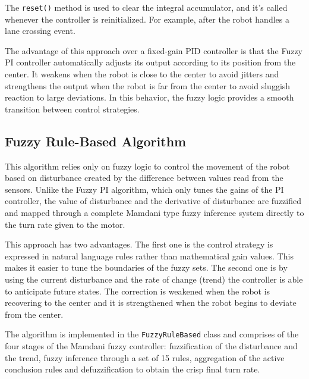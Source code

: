 The \texttt{reset()} method is used to clear the integral accumulator, and it’s called whenever the controller is reinitialized. For example, after the robot handles a lane crossing event.

The advantage of this approach over a fixed-gain PID controller is that the Fuzzy PI controller automatically adjusts its output according to its position from the center. It weakens when the robot is close to the center to avoid jitters and strengthens the output when the robot is far from the center to avoid sluggish reaction to large deviations. In this behavior, the fuzzy logic provides a smooth transition between control strategies.

\subsection{Fuzzy Rule-Based Algorithm}
\label{sec:fuzzy-rb}

This algorithm relies only on fuzzy logic to control the movement of the robot based on disturbance created by the difference between values read from the sensors. Unlike the Fuzzy PI algorithm, which only tunes the gains of the PI controller, the value of disturbance and the derivative of disturbance are fuzzified and mapped through a complete Mamdani type fuzzy inference system directly to the turn rate given to the motor.

This approach has two advantages. The first one is the control strategy is expressed in natural language rules rather than mathematical gain values. This makes it easier to tune the boundaries of the fuzzy sets. The second one is by using the current disturbance and the rate of change (trend) the controller is able to anticipate future states. The correction is weakened when the robot is recovering to the center and it is strengthened when the robot begins to deviate from the center.

The algorithm is implemented in the \texttt{FuzzyRuleBased} class and comprises of the four stages of the Mamdani fuzzy controller: fuzzification of the disturbance and the trend, fuzzy inference through a set of 15 rules, aggregation of the active conclusion rules and defuzzification to obtain the crisp final turn rate.

